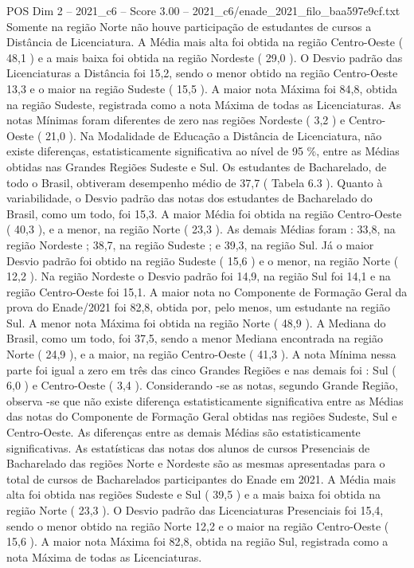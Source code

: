 \begin{textsample}{POS Dim 2 – 2021\_c6 – Score 3.00 – 2021\_c6/enade\_2021\_filo\_baa597e9cf.txt}
Somente na região Norte não houve participação de estudantes de cursos a Distância de Licenciatura.
A Média mais alta foi obtida na região Centro-Oeste ( 48,1 ) e a mais baixa foi obtida na região Nordeste ( 29,0 ).
O Desvio padrão das Licenciaturas a Distância foi 15,2, sendo o menor obtido na região Centro-Oeste 13,3 e o maior na região Sudeste ( 15,5 ).
A maior nota Máxima foi 84,8, obtida na região Sudeste, registrada como a nota Máxima de todas as Licenciaturas.
As notas Mínimas foram diferentes de zero nas regiões Nordeste ( 3,2 ) e Centro-Oeste ( 21,0 ).
Na Modalidade de Educação a Distância de Licenciatura, não existe diferenças, estatisticamente significativa ao nível de 95 \%, entre as Médias obtidas nas Grandes Regiões Sudeste e Sul.
Os estudantes de Bacharelado, de todo o Brasil, obtiveram desempenho médio de 37,7 ( Tabela 6.3 ).
Quanto à variabilidade, o Desvio padrão das notas dos estudantes de Bacharelado do Brasil, como um todo, foi 15,3.
A maior Média foi obtida na região Centro-Oeste ( 40,3 ), e a menor, na região Norte ( 23,3 ).
As demais Médias foram : 33,8, na região Nordeste ; 38,7, na região Sudeste ; e 39,3, na região Sul.
Já o maior Desvio padrão foi obtido na região Sudeste ( 15,6 ) e o menor, na região Norte ( 12,2 ).
Na região Nordeste o Desvio padrão foi 14,9, na região Sul foi 14,1 e na região Centro-Oeste foi 15,1.
A maior nota no Componente de Formação Geral da prova do Enade/2021 foi 82,8, obtida por, pelo menos, um estudante na região Sul.
A menor nota Máxima foi obtida na região Norte ( 48,9 ).
A Mediana do Brasil, como um todo, foi 37,5, sendo a menor Mediana encontrada na região Norte ( 24,9 ), e a maior, na região Centro-Oeste ( 41,3 ).
A nota Mínima nessa parte foi igual a zero em três das cinco Grandes Regiões e nas demais foi : Sul ( 6,0 ) e Centro-Oeste ( 3,4 ).
Considerando -se as notas, segundo Grande Região, observa -se que não existe diferença estatisticamente significativa entre as Médias das notas do Componente de Formação Geral obtidas nas regiões Sudeste, Sul e Centro-Oeste.
As diferenças entre as demais Médias são estatisticamente significativas.
As estatísticas das notas dos alunos de cursos Presenciais de Bacharelado das regiões Norte e Nordeste são as mesmas apresentadas para o total de cursos de Bacharelados participantes do Enade em 2021.
A Média mais alta foi obtida nas regiões Sudeste e Sul ( 39,5 ) e a mais baixa foi obtida na região Norte ( 23,3 ).
O Desvio padrão das Licenciaturas Presenciais foi 15,4, sendo o menor obtido na região Norte 12,2 e o maior na região Centro-Oeste ( 15,6 ).
A maior nota Máxima foi 82,8, obtida na região Sul, registrada como a nota Máxima de todas as Licenciaturas.

\end{textsample}
